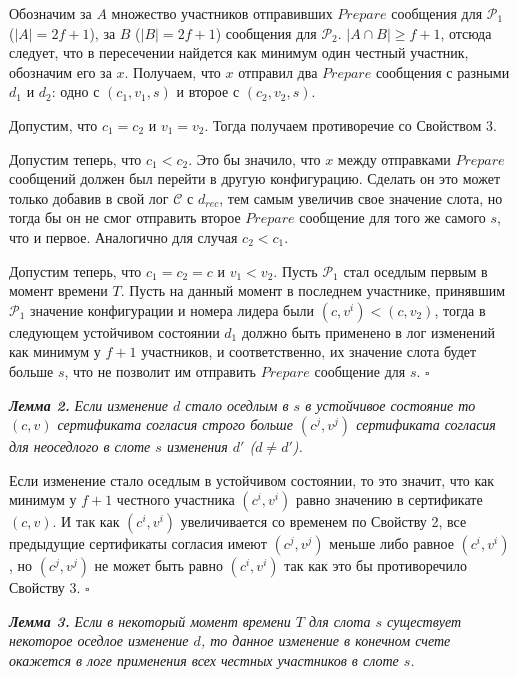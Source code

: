 Обозначим за $A$ множество участников отправивших $Prepare$ сообщения для  $\mathcal{P}_1$ ($|A|=2f+1$), за $B$ ($|B|=2f+1$) сообщения для $\mathcal{P}_2$. $|A \cap B| \ge f+1$, отсюда следует, что в пересечении найдется как минимум один честный участник,  обозначим его за $x$. Получаем, что $x$ отправил два $Prepare$ сообщения с разными $d_1$ и $d_2$: одно с $(c_1, v_1, s)$ и второе с $(c_2, v_2, s)$.

Допустим, что $c_1 = c_2$ и $v_1 = v_2$. Тогда получаем противоречие со Свойством 3.

Допустим теперь, что $c_1 < c_2$. Это бы значило, что $x$ между отправками $Prepare$ сообщений должен был перейти в другую конфигурацию. Сделать он это может только добавив в свой лог $\mathcal{C}$ с $d_{rec}$, тем самым увеличив свое значение слота, но тогда бы он не смог отправить второе $Prepare$ сообщение для того же самого $s$, что и первое. Аналогично для случая $c_2 < c_1$.

Допустим теперь, что $c_1=c_2=c$ и $v_1 < v_2$. Пусть $\mathcal{P}_1$ стал оседлым первым в момент времени $T$. Пусть на данный момент в последнем участнике, принявшим $\mathcal{P}_1$ значение конфигурации и номера лидера были $(c, v^i) < (c, v_2)$, тогда в следующем устойчивом состоянии $d_1$ должно быть применено в лог изменений как минимум у $f+1$ участников, и соответственно, их значение слота будет больше $s$, что не позволит им отправить $Prepare$ сообщение для $s$. $\square$
\vspace{10pt}

\textbf{\textit{Лемма 2.}} \textit{Если изменение $d$ стало оседлым в $s$ в устойчивое состояние то $(c, v)$ сертификата согласия строго больше $(c^j, v^j)$ сертификата согласия для неоседлого в слоте $s$ изменения $d'$ ($d \ne d'$).}

Если изменение стало оседлым в устойчивом состоянии, то это значит, что как минимум у $f+1$ честного участника $(c^i, v^i)$ равно значению в сертификате $(c, v)$. И так как $(c^i, v^i)$ увеличивается со временем по Свойству 2, все предыдущие сертификаты согласия имеют $(c^j, v^j)$ меньше либо равное $(c^i, v^i)$, но $(c^j, v^j)$ не может быть равно $(c^i, v^i)$ так как это бы противоречило Свойству 3.
$\square$
\vspace{10pt}

\textbf{\textit{Лемма 3.}} \textit{Если в некоторый момент времени $T$ для слота $s$ существует некоторое оседлое изменение $d$, то данное изменение в конечном счете окажется в логе применения всех честных участников в слоте $s$.}

